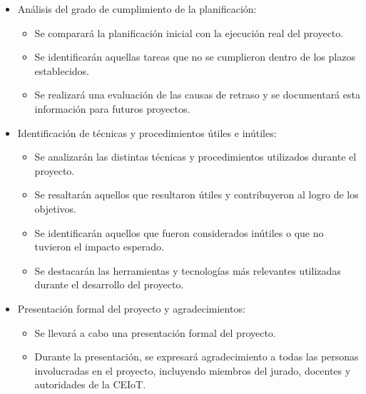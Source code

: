 \documentclass[
11pt, %
]{charter}
\begin{document}
\begin{itemize}
	\item Análisis del grado de cumplimiento de la planificación:
		\begin{itemize}
		\item Se comparará la planificación inicial con la ejecución real del proyecto. 
		\item Se identificarán aquellas tareas que no se cumplieron dentro de los plazos establecidos.
		\item Se realizará una evaluación de las causas de retraso y se documentará esta información para futuros proyectos. 
	 \end{itemize}
	\item Identificación de técnicas y procedimientos útiles e inútiles:
		\begin{itemize}
		\item Se analizarán las distintas técnicas y procedimientos utilizados durante el proyecto.
		\item Se resaltarán aquellos que resultaron útiles y contribuyeron al logro de los objetivos.
		\item Se identificarán aquellos que fueron considerados inútiles o que no tuvieron el impacto esperado.
		\item Se destacarán las herramientas y tecnologías más relevantes utilizadas durante el desarrollo del proyecto.
	 \end{itemize}
	\item Presentación formal del proyecto y agradecimientos:
		\begin{itemize}
		\item Se llevará a cabo una presentación formal del proyecto. 
		\item Durante la presentación, se expresará agradecimiento a todas las personas involucradas en el proyecto, incluyendo miembros del jurado, docentes y autoridades de la CEIoT.
	 \end{itemize}
\end{itemize}
\end{document}

